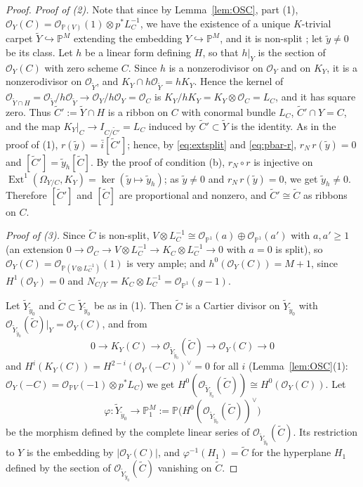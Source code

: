 \documentclass[11pt,reqno]{amsart}
\theoremstyle{plain}
\theoremstyle{definition}
\newcommand{\PP}{\mathbb{P}}
\newcommand{\OO}{\mathcal{O}}
\newcommand{\Ext}{\operatorname{Ext}}
\newcommand{\Yt}{\widetilde{Y}}
\newcommand{\Ct}{\widetilde{C}}
\newcommand{\yt}{\tilde{y}}
\begin{document}
\begin{proof}
\emph{Proof of (2).} Note that since by Lemma~\ref{lem:OSC}, part (1), $\OO_Y(C)=\OO_{\PP(V)}(1)\otimes p^*L_C^{-1}$, we have the existence of a unique $K$-trivial carpet $\Yt\hookrightarrow\PP^M$ extending the embedding $Y\hookrightarrow\PP^M$, and it is non-split \cite[Proposition~3.2]{DM25}; let $\yt\ne0$ be its class. Let $h$ be a linear form defining $H$, so that $h|_Y$ is the section of $\OO_Y(C)$ with zero scheme $C$. Since $h$ is a nonzerodivisor on $\OO_Y$ and on $K_Y$, it is a nonzerodivisor on $\OO_{\Yt}$, and $K_Y\cap h\OO_{\Yt}=hK_Y$. Hence the kernel of $\OO_{\Yt\cap H}=\OO_{\Yt}/h\OO_{\Yt}\to\OO_Y/h\OO_Y=\OO_C$ is $K_Y/hK_Y=K_Y\otimes\OO_C=L_C$, and it has square zero. Thus $\Ct':=\Yt\cap H$ is a ribbon on $C$ with conormal bundle $L_C$, $\Ct'\cap Y=C$, and the map $K_Y|_C\to I_{C/\Ct'}=L_C$ induced by $\Ct'\subset\Yt$ is the identity. As in the proof of (1), $r(\yt)=\bar i[\Ct']$; hence, by \eqref{eq:extsplit} and \eqref{eq:pbar-r}, $r_N\,r(\yt)=0$ and $[\Ct']=\yt_h[\Ct]$. By the proof of condition (b), $r_N\circ r$ is injective on $\Ext^1(\Omega_{Y/C},K_Y)=\ker(\yt\mapsto\yt_h)$; as $\yt\ne0$ and $r_N\,r(\yt)=0$, we get $\yt_h\ne0$. Therefore $[\Ct']$ and $[\Ct]$ are proportional and nonzero, and $\Ct'\cong\Ct$ as ribbons on $C$.

\emph{Proof of (3).} Since $\Ct$ is non-split, $V\otimes L_C^{-1}\cong\OO_{\PP^1}(a)\oplus\OO_{\PP^1}(a')$ with $a,a'\ge1$ (an extension $0\to\OO_C\to V\otimes L_C^{-1}\to K_C\otimes L_C^{-1}\to0$ with $a=0$ is split), so $\OO_Y(C)=\OO_{\PP(V\otimes L_C^{-1})}(1)$ is very ample; and $h^0(\OO_Y(C))=M+1$, since $H^1(\OO_Y)=0$ and $N_{C/Y}=K_C\otimes L_C^{-1}=\OO_{\PP^1}(g-1)$.

Let $\Yt_{\yt_0}$ and $\Ct\subset\Yt_{\yt_0}$ be as in (1). Then $\Ct$ is a Cartier divisor on $\Yt_{\yt_0}$ with $\OO_{\Yt_{\yt_0}}(\Ct)|_Y=\OO_Y(C)$, and from
\[
0\to K_Y(C)\to\OO_{\Yt_{\yt_0}}(\Ct)\to\OO_Y(C)\to0
\]
and $H^i(K_Y(C))=H^{2-i}(\OO_Y(-C))^{\vee}=0$ for all $i$ (Lemma~\ref{lem:OSC}(1): $\OO_Y(-C)=\OO_{\PP V}(-1)\otimes p^*L_C$) we get $H^0(\OO_{\Yt_{\yt_0}}(\Ct))\cong H^0(\OO_Y(C))$. Let
\[
\varphi\colon\Yt_{\yt_0}\to\PP^M_1:=\PP\big(H^0(\OO_{\Yt_{\yt_0}}(\Ct))^{\vee}\big)
\]
be the morphism defined by the complete linear series of $\OO_{\Yt_{\yt_0}}(\Ct)$. Its restriction to $Y$ is the embedding by $|\OO_Y(C)|$, and $\varphi^{-1}(H_1)=\Ct$ for the hyperplane $H_1$ defined by the section of $\OO_{\Yt_{\yt_0}}(\Ct)$ vanishing on $\Ct$.


\end{proof}
\end{document}
